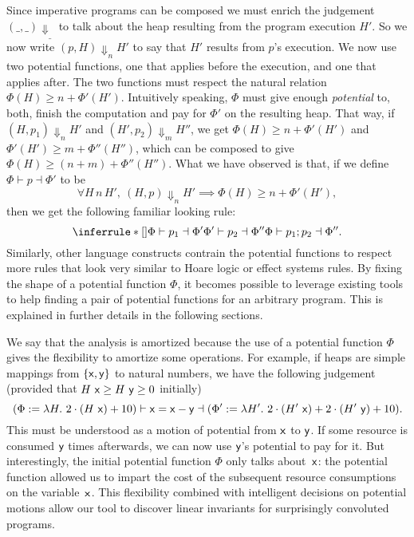 \documentclass[nocopyrightspace,preprint]{sigplanconf}
\begin{document}
Since imperative programs can be composed we must enrich
the judgement $(\_, \_) \Downarrow_{\_}$ to talk about the heap
resulting from the program execution $H'$.  So we now write
$(p, H) \Downarrow_n H'$ to say that $H'$ results from $p$'s
execution.  We now use two potential functions, one
that applies before the execution, and one that applies
after.  The two functions must respect the natural relation
$\Phi(H) \ge n + \Phi'(H')$.  Intuitively speaking, $\Phi$ must
give enough \emph{potential} to, both, finish the computation
and pay for $\Phi'$ on the resulting heap. That way, if $(H, p_1) \Downarrow_n H'$
and $(H', p_2) \Downarrow_m H''$, we get $\Phi(H) \ge
n + \Phi'(H')$ and $\Phi'(H') \ge m + \Phi''(H'')$, which
can be composed to give $\Phi(H) \ge (n + m) + \Phi''(H'')$.
What we have observed is that, if we define $\Phi \vdash p \dashv \Phi'$
to be
$$
\forall H\,n\,H',~(H, p)\Downarrow_n H' \implies \Phi(H) \ge
n + \Phi'(H'),
$$
then we get the following familiar looking rule:
$$
\RuleNolabel
{\Phi \vdash p_1 \dashv \Phi' \\ \Phi' \vdash p_2 \dashv \Phi''}
{\Phi \vdash p_1; p_2 \dashv \Phi''}
.
$$
Similarly, other language constructs contrain the potential
functions to respect more rules that look very similar to
Hoare logic or effect systems rules.  By fixing the shape of
a potential function $\Phi$, it becomes possible to leverage
existing tools to help finding a pair of potential functions
for an arbitrary program.  This is explained in further details
in the following sections.

We say that the analysis is amortized because the use of a
potential function $\Phi$ gives the flexibility to amortize some
operations.  For example, if heaps are simple mappings from
$\{\mathsf{x}, \mathsf{y}\}$ to natural numbers, we have the following
judgement (provided that $H~\mathsf{x} \ge H~\mathsf{y} \ge 0$ initially)
$$
(\Phi := \lambda H.~2\cdot(H~\mathsf{x}) + 10)
\vdash \mathsf{x} = \mathsf{x} - \mathsf{y} \dashv
(\Phi' := \lambda H'.~2\cdot(H'~\mathsf{x}) + 2\cdot(H'~\mathsf{y}) + 10).
$$
This must be understood as a motion of potential from $\mathsf{x}$
to $\mathsf{y}$. If some resource is consumed $\mathsf{y}$ times afterwards, we
can now use $\mathsf{y}$'s potential to pay for it. But interestingly, the
initial potential function $\Phi$ only talks about~$\mathsf{x}$: the potential
function allowed us to impart the cost of the subsequent resource
consumptions on the variable~$\mathsf{x}$.
This flexibility combined with intelligent decisions on potential
motions allow our tool to discover linear invariants for surprisingly
convoluted programs.
\end{document}
